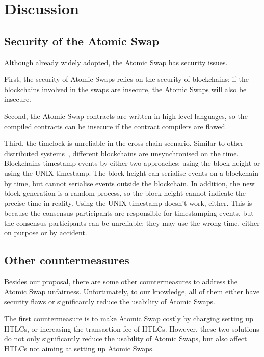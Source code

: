 \section{Discussion}
\label{sec:discussion}

\subsection{Security of the Atomic Swap}

Although already widely adopted, the Atomic Swap has security issues.

First, the security of Atomic Swaps relies on the security of blockchains:
if the blockchains involved in the swaps are insecure, the Atomic Swaps will also be insecure.

Second, the Atomic Swap contracts are written in high-level languages, so the compiled contracts can be insecure if the contract compilers are flawed.

Third, the timelock is unreliable in the cross-chain scenario.
Similar to other distributed systems~\cite{coulouris2012distributed}, different blockchains are unsynchronised on the time.
Blockchains timestamp events by either two approaches: using the block height or using the UNIX timestamp.
The block height can serialise events on a blockchain by time, but cannot serialise events outside the blockchain.
In addition, the new block generation is a random process, so the block height cannot indicate the precise time in reality.
Using the UNIX timestamp doesn't work, either.
This is because the consensus participants are responsible for timestamping events, but the consensus participants can be unreliable:
they may use the wrong time, either on purpose or by accident.


\subsection{Other countermeasures}

Besides our proposal, there are some other countermeasures to address the Atomic Swap unfairness.
Unfortunately, to our knowledge, all of them either have security flaws or significantly reduce the usability of Atomic Swaps.

The first countermeasure is to make Atomic Swap costly by charging setting up HTLCs, or increasing the transaction fee of HTLCs.
However, these two solutions do not only significantly reduce the usability of Atomic Swaps, but also affect HTLCs not aiming at setting up Atomic Swaps.

